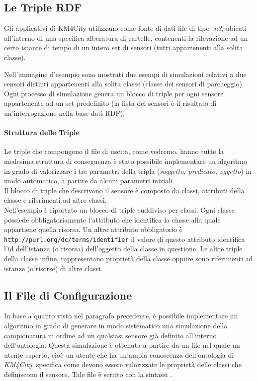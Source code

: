 \documentclass[12pt,a4paper,italian]{article}
\begin{document}
\subsection{Le Triple RDF}
Gli applicativi di KM4City utilizzano come fonte di dati file di tipo \emph{.n3}, ubicati all'interno di una specifica alberatura di cartelle, 
contenenti la rilevazione ad un certo istante di tempo di un intero set di sensori (tutti appartenenti alla solita classe).


Nell'immagine d'esempio sono mostrati due esempi di simulazioni relativi a due sensori distinti appartenenti alla solita classe (classe dei sensori di parcheggio). 
Ogni processo di simulazione genera un blocco di triple per ogni sensore appartenente ad un set predefinito (la lista dei sensori è il
risultato di un'interrogazione nella base dati RDF).
\paragraph{Struttura delle Triple}
Le triple che compongono il file di uscita, come vedremo, hanno tutte la medesima struttura di conseguenza è stato possibile implementare un algoritmo in grado di valorizzare
i tre parametri della tripla (\emph{soggetto, predicato, oggetto}) in modo automatico, a partire da alcuni parametri iniziali.\\
Il blocco di triple che descrivono il sensore è composto da classi, attributi della classe e riferimenti ad altre classi.\\
Nell'esempio è riportato un blocco di triple suddiviso per classi. Ogni classe possiede obbligatoriamente l'attributo  che identifica la classe alla quale appartiene quella risorsa.
Un altro attributo obbligatorio è \texttt{http://purl.org/dc/terms/identifier} il valore di questo attributo identifica l'id dell'istanza (o risorsa) dell'oggetto della classe in questione.
Le altre triple della classe infine, rappresentano proprietà della classe oppure sono riferimenti ad istanze (o risorse) di altre classi.

\subsection{Il File di Configurazione}
In base a quanto visto nel paragrafo precedente, è possibile implementare un algoritmo in grado di generare in modo sistematico una simulazione della campionatura in ordine ad un qualsiasi  
sensore già definito all'interno dell'ontologia.
Questa simulazione è ottenuta a partire da un file nel quale un utente esperto, cioè un utente che ha un'ampia conoscenza dell'ontologia di \emph{KM4City}, specifica come devono essere valorizzate le proprietà 
delle classi che definiscono il sensore. Tale file è scritto con la sintassi .
\end{document}
